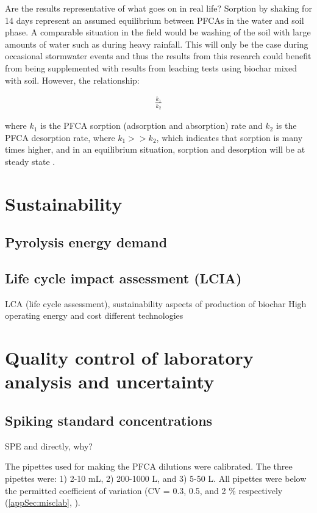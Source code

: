 Are the results representative of what goes on in real life? Sorption by shaking for 14 days represent an assumed equilibrium between PFCAs in the water and soil phase. A comparable situation in the field would be washing of the soil with large amounts of water such as during heavy rainfall. This will only be the case during occasional stormwater events and thus the results from this research could benefit from being supplemented with results from leaching tests using biochar mixed with soil. However, the relationship:

\begin{align}
    \frac{k_1}{k_2}
\end{align}

where \(k_1\) is the PFCA sorption (adsorption and absorption) rate and \(k_2\) is the PFCA desorption rate, where \(k_1>>k_2\), which indicates that sorption is many times higher, and in an equilibrium situation, sorption and desorption will be at steady state \citep{Cornelissen2005}. 


\section{Sustainability}
\subsection{Pyrolysis energy demand}
\subsection{Life cycle impact assessment (LCIA)}
LCA (life cycle assessment), sustainability aspects of production of biochar
High operating energy and cost different technologies \citep{Alhashimi2017}

\section{Quality control of laboratory analysis and uncertainty}

\subsection{Spiking standard concentrations}
SPE and directly, why?

The pipettes used for making the PFCA dilutions were calibrated. The three pipettes were: 1) 2-10 mL, 2) 200-1000 \textmu L, and 3) 5-50 \textmu L. All pipettes were below the permitted coefficient of variation (CV = 0.3, 0.5, and 2 $\%$ respectively (\cref{appSec:misclab}, ).

